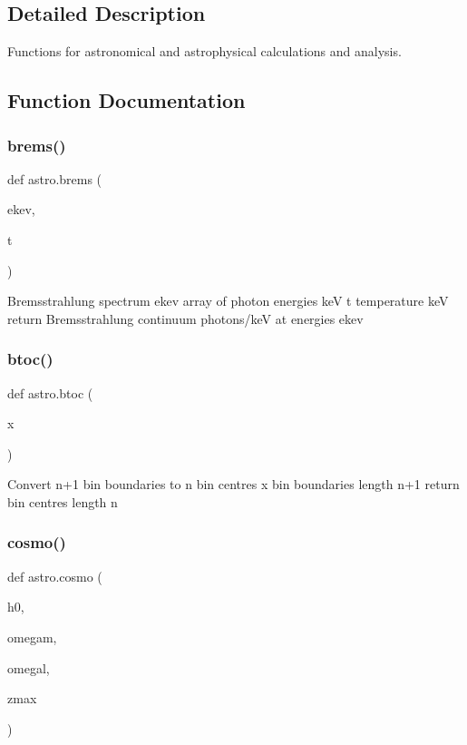 \subsection{Detailed Description}
Functions for astronomical and astrophysical calculations and analysis. 

\subsection{Function Documentation}
\mbox{\label{namespaceastro_ae210e281dcd0615b0b93a5e37ab2e155}} 
\subsubsection{\texorpdfstring{brems()}{brems()}}
{\footnotesize\ttfamily def astro.\+brems (\begin{DoxyParamCaption}\item[{}]{ekev,  }\item[{}]{t }\end{DoxyParamCaption})}

\begin{DoxyVerb}Bremsstrahlung spectrum
    ekev    array of photon energies keV
    t       temperature keV
return  Bremsstrahlung continuum photons/keV at energies ekev
\end{DoxyVerb}
 \mbox{\label{namespaceastro_ac33d063fb308b84fa6d78e4316d225cc}} 
\subsubsection{\texorpdfstring{btoc()}{btoc()}}
{\footnotesize\ttfamily def astro.\+btoc (\begin{DoxyParamCaption}\item[{}]{x }\end{DoxyParamCaption})}

\begin{DoxyVerb}Convert n+1 bin boundaries to n bin centres
    x      bin boundaries length n+1
return bin centres length n
\end{DoxyVerb}
 \mbox{\label{namespaceastro_a952304e1afa9abfc8d33a7e34eb47e38}} 
\subsubsection{\texorpdfstring{cosmo()}{cosmo()}}
{\footnotesize\ttfamily def astro.\+cosmo (\begin{DoxyParamCaption}\item[{}]{h0,  }\item[{}]{omegam,  }\item[{}]{omegal,  }\item[{}]{zmax }\end{DoxyParamCaption})}

